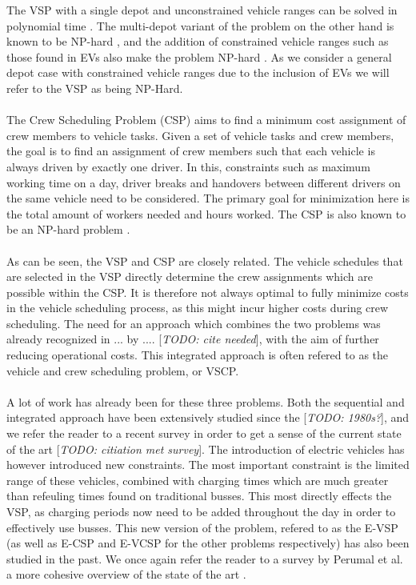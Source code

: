 \documentclass[]{article}
\newcommand{\todo}[1]{{\color{red}[\textit{TODO: #1}]}}
\begin{document}
The VSP with a single depot and unconstrained vehicle ranges can be solved in polynomial time \cite{Freling2003SDVSP}. The multi-depot variant of the problem on the other hand is known to be NP-hard \cite{RAFF198363, Bertossi1987, Even1975}, and the addition of constrained vehicle ranges such as those found in EVs also make the problem NP-hard \cite{RAFF198363, Sassi2014}. As we consider a general depot case with constrained vehicle ranges due to the inclusion of EVs we will refer to the VSP as being NP-Hard. \\\\ 
The Crew Scheduling Problem (CSP) aims to find a minimum cost assignment of crew members to vehicle tasks. Given a set of vehicle tasks and crew members, the goal is to find an assignment of crew members such that each vehicle is always driven by exactly one driver. In this, constraints such as maximum working time on a day, driver breaks and handovers between different drivers on the same vehicle need to be considered. The primary goal for minimization here is the total amount of workers needed and hours worked. The CSP is also known to be an NP-hard problem \cite{Fischetti1989}.\\\\
As can be seen, the VSP and CSP are closely related. The vehicle schedules that are selected in the VSP directly determine the crew assignments which are possible within the CSP. It is therefore not always optimal to fully minimize costs in the vehicle scheduling process, as this might incur higher costs during crew scheduling. The need for an approach which combines the two problems was already recognized in ... by .... \todo{cite needed}, with the aim of further reducing operational costs. This integrated approach is often refered to as the vehicle and crew scheduling problem, or VSCP. \\\\
A lot of work has already been for these three problems. Both the sequential and integrated approach have been extensively studied since the \todo{1980s?}, and we refer the reader to a recent survey in order to get a sense of the current state of the art \todo{citiation met survey}. The introduction of electric vehicles has however introduced new constraints. The most important constraint is the limited range of these vehicles, combined with charging times which are much greater than refeuling times found on traditional busses. This most directly effects the VSP, as charging periods now need to be added throughout the day in order to effectively use busses. This new version of the problem, refered to as the E-VSP (as well as E-CSP and E-VCSP for the other problems respectively) has also been studied in the past. We once again refer the reader to a survey by Perumal et al. a more cohesive overview of the state of the art \cite{PERUMAL2022395}. \\\\
\end{document}
